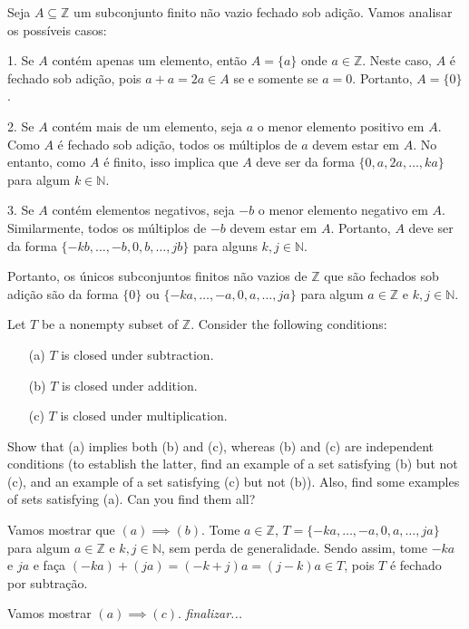 \begin{solucao}
	Seja \( A \subseteq \mathbb{Z} \) um subconjunto finito não vazio fechado sob adição. Vamos analisar os possíveis casos:

	1. Se \( A \) contém apenas um elemento, então \( A = \{a\} \) onde \( a \in \mathbb{Z} \). Neste caso, \( A \) é fechado sob adição, pois \( a + a = 2a \in A \) se e somente se \( a = 0 \). Portanto, \( A = \{0\} \).

	2. Se \( A \) contém mais de um elemento, seja \( a \) o menor elemento positivo em \( A \). Como \( A \) é fechado sob adição, todos os múltiplos de \( a \) devem estar em \( A \). No entanto, como \( A \) é finito, isso implica que \( A \) deve ser da forma \( \{0, a, 2a, \ldots, ka\} \) para algum \( k \in \mathbb{N} \).

	3. Se \( A \) contém elementos negativos, seja \( -b \) o menor elemento negativo em \( A \). Similarmente, todos os múltiplos de \( -b \) devem estar em \( A \). Portanto, \( A \) deve ser da forma \( \{-kb, \ldots, -b, 0, b, \ldots, jb\} \) para alguns \( k, j \in \mathbb{N} \).

	Portanto, os únicos subconjuntos finitos não vazios de \( \mathbb{Z} \) que são fechados sob adição são da forma \( \{0\} \) ou \( \{-ka, \ldots, -a, 0, a, \ldots, ja\} \) para algum \( a \in \mathbb{Z} \) e \( k, j \in \mathbb{N} \).
\end{solucao}

\begin{exercicio}{1.20}
	Let \( T \) be a nonempty subset of \( \mathbb{Z} \). Consider the following conditions:
	\begin{itemize}
		\item[(a)] \( T \) is closed under subtraction.
		\item[(b)] \( T \) is closed under addition.
		\item[(c)] \( T \) is closed under multiplication.
	\end{itemize}

	Show that (a) implies both (b) and (c), whereas (b) and (c) are independent conditions
	(to establish the latter, find an example of a set satisfying (b) but not (c), and an example of a set satisfying (c) but not (b)). Also, find some examples of sets satisfying (a). Can you find them all?
\end{exercicio}

\begin{solucao}
	Vamos mostrar que $(a) \implies (b)$. Tome \(a \in \mathbb{Z}\), \newline \(T = \{-ka, \ldots, -a, 0, a, \ldots, ja\}\) para algum \(a \in \mathbb{Z} \) e \( k, j \in \mathbb{N}  \), sem perda de generalidade. Sendo assim, tome $-ka$ e $ja$ e faça $(-ka) + (ja) = (-k + j)a = (j - k)a \in T$, pois $T$ é fechado por subtração.

	Vamos mostrar $(a) \implies (c)$. \textit{finalizar...}
\end{solucao}

